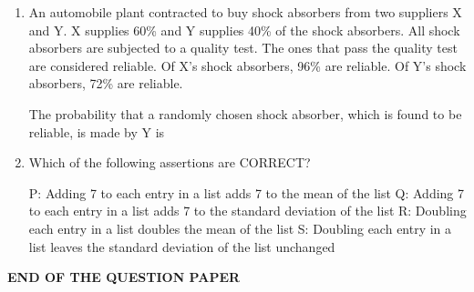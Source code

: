 \documentclass[journal,11pt,onecolumn]{IEEEtran}
\begin{document}
\begin{enumerate}[resume]
    \item An automobile plant contracted to buy shock absorbers from two suppliers X and Y. X supplies 60\% and Y supplies 40\% of the shock absorbers. All shock absorbers are subjected to a quality test. The ones that pass the quality test are considered reliable. Of X's shock absorbers, 96\% are reliable. Of Y's shock absorbers, 72\% are reliable.

          The probability that a randomly chosen shock absorber, which is found to be reliable, is made by Y is

          \begin{enumerate}
          \end{enumerate}

    \item Which of the following assertions are CORRECT?

          P: Adding 7 to each entry in a list adds 7 to the mean of the list
          Q: Adding 7 to each entry in a list adds 7 to the standard deviation of the list
          R: Doubling each entry in a list doubles the mean of the list
          S: Doubling each entry in a list leaves the standard deviation of the list unchanged

          \begin{enumerate}
          \end{enumerate}

\end{enumerate}

\vspace{1cm}
\centering\Large\textbf{END OF THE QUESTION PAPER}
\end{document}
